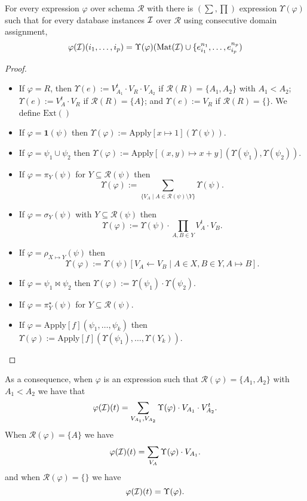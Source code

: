 \begin{lemma}
For every \ARA expression $\varphi$ over schema $\mathcal{R}$ with there is \lang$(\sum,\prod)$ expression $\Upsilon(\varphi)$ such that for every database instances $\mathcal{I}$ over $\mathcal{R}$ using consecutive domain assignment, 
$$
\varphi(\mathcal{I})(i_1,\ldots,i_p)=\Upsilon(\varphi)(\text{Mat}(\mathcal{I})\cup \{e_{i_1}^{n_1},\ldots,e_{i_p}^{n_p})
$$
\end{lemma}
\begin{proof}
\begin{itemize}
\item If $\varphi=R$, then $\Upsilon(e):=V_{A_1}^t\cdot V_R\cdot V_{A_2}$ if $\mathcal{R}(R)=\{A_1,A_2\}$ with $A_1<A_2$; 
$\Upsilon(e):=V_A^t\cdot V_R$ if $\mathcal{R}(R)=\{A\}$; and 
$\Upsilon(e):=V_R$ if $\mathcal{R}(R)=\{\}$. We define $\text{Ext}()$
\item If $\varphi=\mathbf{1}(\psi)$  then $
\Upsilon(\varphi):=\text{Apply}[x\mapsto 1](\Upsilon(\psi))$.
\item If $\varphi=\psi_1\cup \psi_2$ then
$\Upsilon(\varphi):=\text{Apply}[(x,y)\mapsto x+y](\Upsilon(\psi_1),\Upsilon(\psi_2))$.
\item If $\varphi=\pi_{Y}(\psi)$ for $Y\subseteq \mathcal{R}(\psi)$ then
$$
\Upsilon(\varphi):=\sum_{\{V_A\mid A\in \mathcal{R}(\psi)\setminus Y\}}\Upsilon(\psi).
 $$
\item If $\varphi=\sigma_{Y}(\psi)$ with $Y\subseteq\mathcal{R}(\psi)$ then
$$
 \Upsilon(\varphi):=\Upsilon(\psi)\cdot\prod_{A,B\in Y} V_{A}^t\cdot V_{B}.
$$
\item If $\varphi=\rho_{X\mapsto Y}(\psi)$ then
$$\Upsilon(\varphi):=\Upsilon(\psi)[V_A\gets V_B\mid A\in X, B\in Y, A\mapsto B].$$
\item If $\varphi=\psi_1\bowtie \psi_2$ then
$\Upsilon(\varphi):=\Upsilon(\psi_1)\cdot \Upsilon(\psi_2)$.
\item If $\varphi=\pi_{Y}^\star(\psi)$ for $Y\subseteq \mathcal{R}(\psi)$.  
\item If $\varphi=\text{Apply}[f](\psi_1,\ldots,\psi_k)$  then
$\Upsilon(\varphi):=\text{Apply}[f](\Upsilon(\psi_1),\ldots,\Upsilon(Y_k))$.
\end{itemize}
\end{proof}
As a consequence, when $\varphi$ is an \ARA expression such that $\mathcal{R}(\varphi)=\{A_1,A_2\}$ with $A_1<A_2$ we have that 
$$
\varphi(\mathcal{I})(t)=
\sum_{V_{A_1},V_{A_2}}\Upsilon(\varphi)\cdot V_{A_1}\cdot V_{A_2}^t.
$$
When $\mathcal{R}(\varphi)=\{A\}$ we have
$$
\varphi(\mathcal{I})(t)=
\sum_{V_{A}}\Upsilon(\varphi)\cdot V_{A_1}.
$$
and
when $\mathcal{R}(\varphi)=\{\}$ we have
$$
\varphi(\mathcal{I})(t)=\Upsilon(\varphi).
$$
 


